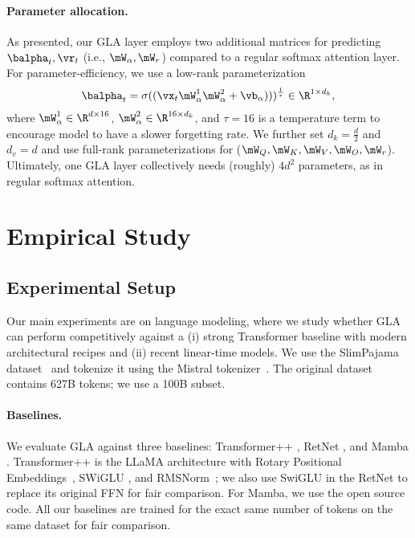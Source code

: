 \paragraph{Parameter allocation.}  As presented, our GLA layer employs two additional matrices  for predicting $\balpha_t, \vr_t$ (i.e., $\mW_\alpha, \mW_r$) compared to a regular softmax attention layer. %
For parameter-efficiency, we use a low-rank parameterization 
\begin{align*}
   \balpha_t = \sigma((\vx_t \mW^1_\alpha \mW^2_\alpha + \vb_\alpha)))^{\frac{1}{\tau}}   \in \R^{1 \times d_k},
\end{align*}
where $\mW^1_\alpha \in \R^{d \times 16}$, $\mW^2_\alpha \in \R^{16 \times d_k}$, and $\tau = 16$ is a temperature term to encourage model to have a slower forgetting rate. 
We further set $d_k = \frac{d}{2}$ and $d_v = d$ and use  full-rank parameterizations for ($\mW_Q, \mW_K, \mW_V, \mW_O, \mW_r$). 
Ultimately, one GLA layer collectively needs (roughly) $4d^2$ parameters, as in regular softmax attention. 

\vspace{-2mm}
\section{Empirical Study}
\vspace{-2mm}
\label{sec:experiments}

\subsection{Experimental Setup}
\vspace{-2mm}
Our main experiments are on language modeling, where we study whether  GLA  can perform competitively against a (i) strong Transformer baseline with modern architectural recipes and (ii) recent linear-time models. We use the SlimPajama dataset~\citep{cerebras2023slimpajama} and tokenize it using the Mistral tokenizer~\citep{jiang2023mistral}. The original dataset contains 627B tokens; we use a 100B subset.

\vspace{-2mm}
\paragraph{Baselines.} We evaluate  GLA  against three baselines: Transformer++ \citep{touvron2023llama}, RetNet \citep{sun2023retentive}, and Mamba \citep{Gu2023MambaLS}. 
Transformer++ is the LLaMA  architecture with Rotary Positional Embeddings~\citep{rope}, SWiGLU \citep{shazeer2020glu}, and RMSNorm~\citep{rmsnorm}; we also use SwiGLU in the RetNet to replace its original FFN for fair comparison. For Mamba, we use the open source code. All our baselines are trained for the exact same number of tokens on the same dataset for fair comparison.

